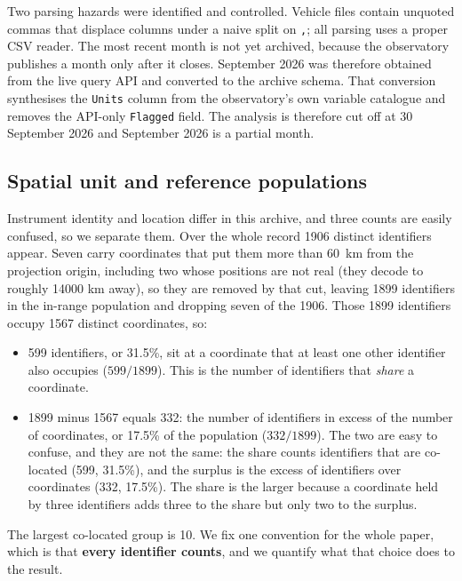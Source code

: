 \documentclass{article}
\newcommand{\nAnalysed}{1899}
\newcommand{\nLocations}{1567}
\newcommand{\nShared}{599}
\newcommand{\nSurplus}{332}
\newcommand{\sharePct}{31.5}
\newcommand{\surplusPct}{17.5}
\newcommand{\maxCoLoc}{10}
\begin{document}
Two parsing hazards were identified and controlled. Vehicle files contain unquoted
commas that displace columns under a naive split on \texttt{,}; all parsing uses a
proper CSV reader. The most recent month is not yet archived, because the observatory publishes a month
only after it closes. September 2026 was therefore obtained from the live query API and
converted to the archive schema. That conversion synthesises the \texttt{Units} column
from the observatory's own variable catalogue and removes the API-only \texttt{Flagged}
field. The analysis is therefore cut off at 30 September 2026 and September 2026 is a
partial month.

\subsection{Spatial unit and reference populations}
\label{sec:units}

Instrument identity and location differ in this archive, and three counts are easily
confused, so we separate them. Over the whole record \num{1906} distinct identifiers
appear. Seven carry coordinates that put them more than \SI{60}{\kilo\meter} from the
projection origin, including two whose positions are not real (they decode to roughly
14000 km away), so they are removed by that cut, leaving
\num{1899} identifiers in the in-range population and dropping seven of the 1906. Those
\num{1899} identifiers occupy
\nLocations{} distinct coordinates, so:
\begin{itemize}
\item \nShared{} identifiers, or \sharePct\%, sit at a coordinate that at least one other
identifier also occupies ($\nShared{}/\nAnalysed{}$). This is the number of identifiers that
\emph{share} a coordinate.
\item \nAnalysed{} minus \nLocations{} equals \nSurplus{}: the number of identifiers
in excess of the number of coordinates, or \surplusPct\% of the population
($\nSurplus{}/\nAnalysed{}$). The two are easy to confuse, and they are not the
same: the share counts identifiers that are co-located (\nShared{}, \sharePct\%), and the
surplus is the excess of identifiers over coordinates (\nSurplus{}, \surplusPct\%). The share
is the larger because a coordinate held by three identifiers adds three to the share but only
two to the surplus.
\end{itemize}
The largest co-located group is \maxCoLoc{}. We fix one convention for the whole paper,
which is that \textbf{every identifier counts}, and we quantify what that choice does to
the result.
\end{document}
